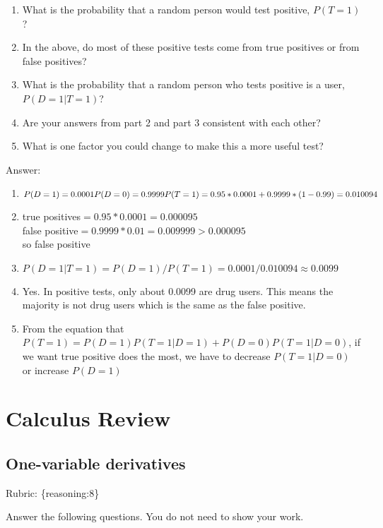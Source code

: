 \documentclass{article}
\def\rubric#1{\gre{Rubric: \{#1\}}}{}
\def\blu#1{{\color{blu}#1}}
\def\gre#1{{\color{gre}#1}}
\def\enum#1{\begin{enumerate}#1\end{enumerate}}
\begin{document}
\begin{enumerate}
\item What is the probability that a random person would test positive, $P(T=1)$?
\item In the above, do most of these positive tests come from true positives or from false positives?
\item What is the probability that a random person who tests positive is a user, $P(D=1|T=1)$?
\item Are your answers from part 2 and part 3 consistent with each other?
\item What is one factor you could change to make this a more useful test?
\end{enumerate}
\textcolor{gre}{
Answer:
\enum{
\item $P(D=1)=0.0001\\P(D=0)=0.9999\\P(T=1)=0.95*0.0001+0.9999*(1-0.99)=0.010094$
\item true positives$=0.95*0.0001=0.000095$\\false positive$=0.9999*0.01=0.009999>0.000095$\\so false positive
\item $P(D=1|T=1)=P(D=1)/P(T=1)=0.0001/0.010094\approx0.0099$
\item Yes. In positive tests, only about 0.0099 are drug users. This means the majority is not drug users which is the same as the false positive.
\item From the equation that $P(T=1)=P(D=1)P(T=1|D=1)+P(D=0)P(T=1|D=0)$, if we want true positive does the most, we have to decrease $P(T=1|D=0)$ or increase $P(D=1)$
}}

\section{Calculus Review}


\subsection{One-variable derivatives}
\rubric{reasoning:8}

\blu{Answer the following questions.} You do not need to show your work.
\end{document}
